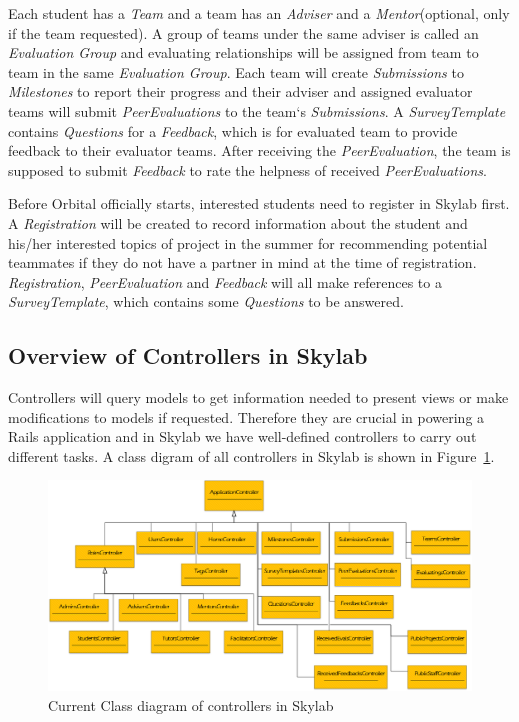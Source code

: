 Each student has a \textit{Team} and a team has an \textit{Adviser} and a \textit{Mentor}(optional, only if the team requested). A group of teams under the same adviser is called an \textit{Evaluation Group} and evaluating relationships will be assigned from team to team in the same \textit{Evaluation Group}. Each team will create \textit{Submissions} to \textit{Milestones} to report their progress and their adviser and assigned evaluator teams will submit \textit{PeerEvaluations} to the team`s \textit{Submissions}. A \textit{SurveyTemplate} contains \textit{Questions} for a \textit{Feedback}, which is for evaluated team to provide feedback to their evaluator teams. After receiving the \textit{PeerEvaluation}, the team is supposed to submit \textit{Feedback} to rate the helpness of received \textit{PeerEvaluations}.

Before Orbital officially starts, interested students need to register in Skylab first. A \textit{Registration} will be created to record information about the student and his/her interested topics of project in the summer for recommending potential teammates if they do not have a partner in mind at the time of registration. \textit{Registration}, \textit{PeerEvaluation} and \textit{Feedback} will all make references to a \textit{SurveyTemplate}, which contains some \textit{Questions} to be answered.

\subsection{Overview of Controllers in Skylab}

Controllers will query models to get information needed to present views or make modifications to models if requested. Therefore they are crucial in powering a Rails application and in Skylab we have well-defined controllers to carry out different tasks. A class digram of all controllers in Skylab is shown in Figure~\ref{fig:SkylabControllers}.

\begin{figure}[h]
  \centering
  \includegraphics[width=\textwidth]{Images/Skylab_Controllers.png}
  \caption{Current Class diagram of controllers in Skylab}
  \label{fig:SkylabControllers}
\end{figure}


